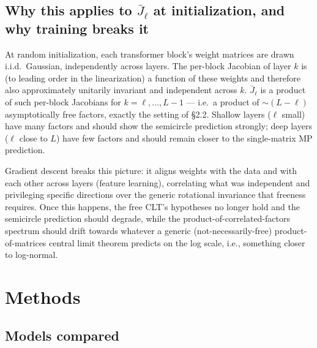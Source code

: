 \documentclass[11pt,a4paper]{article}
\begin{document}
\subsection{Why this applies to $\bar{J}_\ell$ at initialization, and why training breaks it}

At random initialization, each transformer block's weight matrices are drawn i.i.d.\ Gaussian, independently across layers. The per-block Jacobian of layer $k$ is (to leading order in the linearization) a function of these weights and therefore also approximately unitarily invariant and independent across $k$. $\bar{J}_\ell$ is a product of such per-block Jacobians for $k=\ell,\dots,L-1$ --- i.e.\ a product of $\sim(L-\ell)$ asymptotically free factors, exactly the setting of \S2.2. Shallow layers ($\ell$ small) have many factors and should show the semicircle prediction strongly; deep layers ($\ell$ close to $L$) have few factors and should remain closer to the single-matrix MP prediction.

Gradient descent breaks this picture: it aligns weights with the data and with each other across layers (feature learning), correlating what was independent and privileging specific directions over the generic rotational invariance that freeness requires. Once this happens, the free CLT's hypotheses no longer hold and the semicircle prediction should degrade, while the product-of-correlated-factors spectrum should drift towards whatever a generic (not-necessarily-free) product-of-matrices central limit theorem predicts on the log scale, i.e., something closer to log-normal.

\section{Methods}

\subsection{Models compared}
\end{document}
